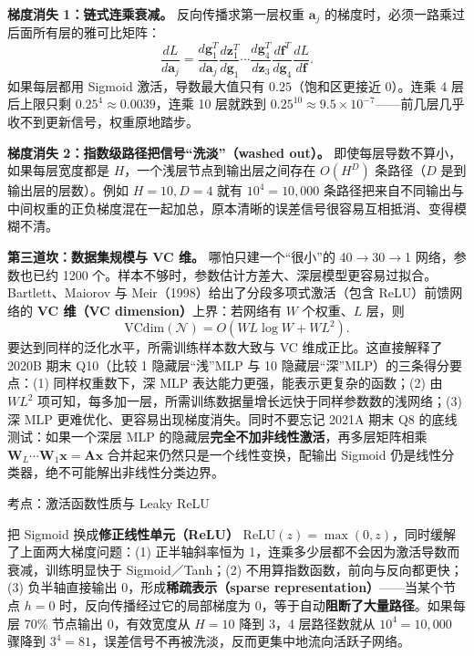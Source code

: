 \textbf{梯度消失 1：链式连乘衰减。} 反向传播求第一层权重 $\mathbf{a}_j$ 的梯度时，必须一路乘过后面所有层的雅可比矩阵：
\[
\frac{dL}{d\mathbf{a}_j} = \frac{d\mathbf{g}_1^T}{d\mathbf{a}_j}\frac{d\mathbf{z}_1^T}{d\mathbf{g}_1}\cdots\frac{d\mathbf{g}_4^T}{d\mathbf{z}_3}\frac{d\mathbf{f}^T}{d\mathbf{g}_4}\frac{dL}{d\mathbf{f}}.
\tag{7.1}
\]
如果每层都用 Sigmoid 激活，导数最大值只有 $0.25$（饱和区更接近 0）。连乘 4 层后上限只剩 $0.25^4 \approx 0.0039$，连乘 10 层就跌到 $0.25^{10} \approx 9.5\times 10^{-7}$——前几层几乎收不到更新信号，权重原地踏步。

\textbf{梯度消失 2：指数级路径把信号“洗淡”（washed out）。} 即使每层导数不算小，如果每层宽度都是 $H$，一个浅层节点到输出层之间存在 $O(H^D)$ 条路径（$D$ 是到输出层的层数）。例如 $H=10, D=4$ 就有 $10^4=10{,}000$ 条路径把来自不同输出与中间权重的正负梯度混在一起加总，原本清晰的误差信号很容易互相抵消、变得模糊不清。

\textbf{第三道坎：数据集规模与 VC 维。} 哪怕只建一个“很小”的 40\ensuremath{\to}30\ensuremath{\to}1 网络，参数也已约 1200 个。样本不够时，参数估计方差大、深层模型更容易过拟合。Bartlett、Maiorov 与 Meir（1998）给出了分段多项式激活（包含 ReLU）前馈网络的 \textbf{VC 维（VC dimension）}上界：若网络有 $W$ 个权重、$L$ 层，则
\[
\mathrm{VCdim}(\mathcal{N}) = O(W L \log W + W L^2).
\tag{7.2}
\]
要达到同样的泛化水平，所需训练样本数大致与 VC 维成正比。这直接解释了 2020B 期末 Q10（比较 1 隐藏层“浅”MLP 与 10 隐藏层“深”MLP）的三条得分要点：(1) 同样权重数下，深 MLP 表达能力更强，能表示更复杂的函数；(2) 由 $W L^2$ 项可知，每多加一层，所需训练数据量增长远快于同样参数数的浅网络；(3) 深 MLP 更难优化、更容易出现梯度消失。同时不要忘记 2021A 期末 Q8 的底线测试：如果一个深层 MLP 的隐藏层\textbf{完全不加非线性激活}，再多层矩阵相乘 $\mathbf{W}_L\cdots\mathbf{W}_1\mathbf{x} = \mathbf{A}\mathbf{x}$ 合并起来仍然只是一个线性变换，配输出 Sigmoid 仍是线性分类器，绝不可能解出非线性分类边界。


考点：激活函数性质与 Leaky ReLU 

把 Sigmoid 换成\textbf{修正线性单元（ReLU）} $\mathrm{ReLU}(z)=\max(0,z)$，同时缓解了上面两大梯度问题：(1) 正半轴斜率恒为 1，连乘多少层都不会因为激活导数而衰减，训练明显快于 Sigmoid／Tanh；(2) 不用算指数函数，前向与反向都更快；(3) 负半轴直接输出 0，形成\textbf{稀疏表示（sparse representation）}——当某个节点 $h=0$ 时，反向传播经过它的局部梯度为 0，等于自动\textbf{阻断了大量路径}。如果每层 70\% 节点输出 0，有效宽度从 $H=10$ 降到 $3$，4 层路径数就从 $10^4=10{,}000$ 骤降到 $3^4=81$，误差信号不再被洗淡，反而更集中地流向活跃子网络。

